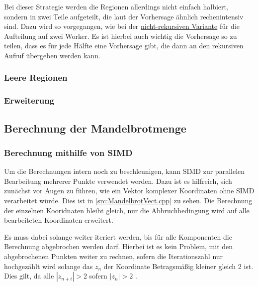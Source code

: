 Bei dieser Strategie werden die Regionen allerdings nicht einfach halbiert, sondern in zwei Teile aufgeteilt, die laut der Vorhersage ähnlich rechenintensiv sind.
Dazu wird so vorgegangen, wie bei der \hyperref[lastbalancierung_vorhersage]{nicht-rekursiven Variante} für die Aufteilung auf zwei Worker.
Es ist hierbei auch wichtig die Vorhersage so zu teilen, dass es für jede Hälfte eine Vorhersage gibt, die dann an den rekursiven Aufruf übergeben werden kann.

\subsubsection{Leere Regionen} \label{lastbalancierung_leereregion}

\subsubsection{Erweiterung} \label{lastbalancierung_erweiterung}

\subsection{Berechnung der Mandelbrotmenge}

\subsubsection{Berechnung mithilfe von SIMD}

Um die Berechnungen intern noch zu beschleunigen, kann SIMD zur parallelen Bearbeitung mehrerer Punkte verwendet werden.
Dazu ist es hilfreich, sich zunächst vor Augen zu führen, wie ein Vektor komplexer Koordinaten ohne SIMD verarbeitet würde.
Dies ist in \autoref{src:MandelbrotVect.cpp} zu sehen.
Die Berechnung der einzelnen Kooridnaten bleibt gleich, nur die Abbruchbedingung wird auf alle bearbeiteten Koordinaten erweitert.

Es muss dabei solange weiter iteriert werden, bis für alle Komponenten die Berechnung abgebrochen werden darf.
Hierbei ist es kein Problem, mit den abgebrochenen Punkten weiter zu rechnen, sofern die 
Iterationszahl nur hochgezählt wird solange das $z_n$ der Koordinate Betragsmäßig kleiner gleich $2$ ist.
Dies gilt, da alle $|z_{n+i}| > 2$ sofern $|z_n| > 2$ \cite{424331}.

\begin{figure}
    
\end{figure}

